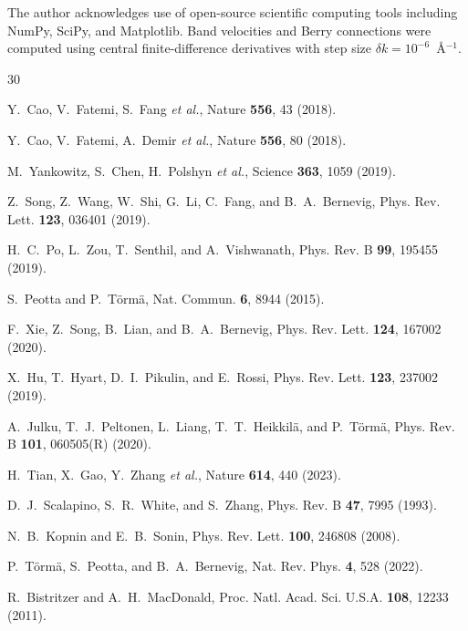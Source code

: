 \documentclass[prb,twocolumn,superscriptaddress,floatfix]{revtex4-2}
\begin{document}
\begin{acknowledgments}
The author acknowledges use of open-source scientific computing tools including NumPy, SciPy, and Matplotlib. Band velocities and Berry connections were computed using central finite-difference derivatives with step size $\delta k = 10^{-6}$~\AA$^{-1}$.
\end{acknowledgments}

\begin{thebibliography}{30}

Y.~Cao, V.~Fatemi, S.~Fang \textit{et al.}, Nature \textbf{556}, 43 (2018).

Y.~Cao, V.~Fatemi, A.~Demir \textit{et al.}, Nature \textbf{556}, 80 (2018).

M.~Yankowitz, S.~Chen, H.~Polshyn \textit{et al.}, Science \textbf{363}, 1059 (2019).

Z.~Song, Z.~Wang, W.~Shi, G.~Li, C.~Fang, and B.~A.~Bernevig, Phys. Rev. Lett. \textbf{123}, 036401 (2019).

H.~C.~Po, L.~Zou, T.~Senthil, and A.~Vishwanath, Phys. Rev. B \textbf{99}, 195455 (2019).

S.~Peotta and P.~T\"orm\"a, Nat. Commun. \textbf{6}, 8944 (2015).

F.~Xie, Z.~Song, B.~Lian, and B.~A.~Bernevig, Phys. Rev. Lett. \textbf{124}, 167002 (2020).

X.~Hu, T.~Hyart, D.~I.~Pikulin, and E.~Rossi, Phys. Rev. Lett. \textbf{123}, 237002 (2019).

A.~Julku, T.~J.~Peltonen, L.~Liang, T.~T.~Heikkil\"a, and P.~T\"orm\"a, Phys. Rev. B \textbf{101}, 060505(R) (2020).

H.~Tian, X.~Gao, Y.~Zhang \textit{et al.}, Nature \textbf{614}, 440 (2023).

D.~J.~Scalapino, S.~R.~White, and S.~Zhang, Phys. Rev. B \textbf{47}, 7995 (1993).

N.~B.~Kopnin and E.~B.~Sonin, Phys. Rev. Lett. \textbf{100}, 246808 (2008).

P.~T\"orm\"a, S.~Peotta, and B.~A.~Bernevig, Nat. Rev. Phys. \textbf{4}, 528 (2022).

R.~Bistritzer and A.~H.~MacDonald, Proc. Natl. Acad. Sci. U.S.A. \textbf{108}, 12233 (2011).


\end{thebibliography}
\end{document}

